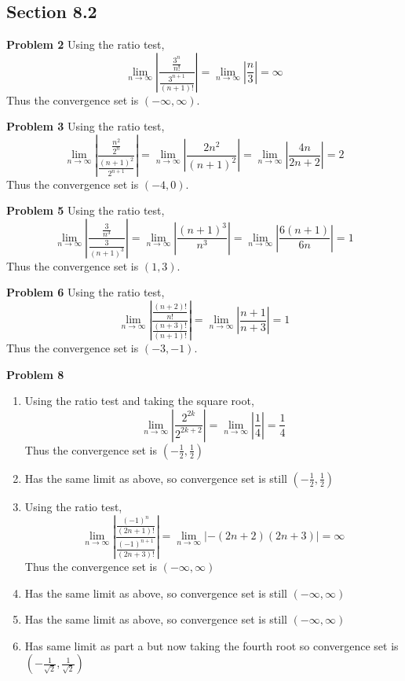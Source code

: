 \subsection*{Section 8.2}
\textbf{Problem 2}
Using the ratio test,
\[
    \lim_{n \to \infty} \left| \frac{\frac{3^n}{n!}}{\frac{3^{n+1}}{(n+1)!}}\right|
    = \lim_{n \to \infty} \left| \frac{n}{3}\right|
    = \infty
\]
Thus the convergence set is $(-\infty, \infty)$. 

\textbf{Problem 3}
Using the ratio test,
\[
    \lim_{n \to \infty} \left| \frac{\frac{n^2}{2^n}}{\frac{(n+1)^2}{2^{n+1}}}\right|
    = \lim_{n \to \infty} \left| \frac{2n^2}{(n+1)^2}\right|
    = \lim_{n \to \infty} \left| \frac{4n}{2n+2}\right|
    = 2
\]
Thus the convergence set is $(-4, 0)$. 

\textbf{Problem 5}
Using the ratio test,
\[
    \lim_{n \to \infty} \left| \frac{\frac{3}{n^3}}{\frac{3}{(n+1)^3}}\right|
    = \lim_{n \to \infty} \left| \frac{(n+1)^3}{n^3}\right|
    = \lim_{n \to \infty} \left| \frac{6(n+1)}{6n}\right|
    = 1
\]
Thus the convergence set is $(1, 3)$. 

\textbf{Problem 6}
Using the ratio test,
\[
    \lim_{n \to \infty} \left| \frac{\frac{(n+2)!}{n!}}{\frac{(n+3)!}{(n+1)!}}\right|
    = \lim_{n \to \infty} \left| \frac{n+1}{n+3} \right|
    = 1
\]
Thus the convergence set is $(-3, -1)$. 

\textbf{Problem 8}
\begin{enumerate}
    \item Using the ratio test and taking the square root,
    \[
        \lim_{n \to \infty} \left| \frac{2^{2k}}{2^{2k+2}}\right|
        = \lim_{n \to \infty} \left| \frac{1}{4} \right|
        = \frac{1}{4}
    \]
    Thus the convergence set is $\left(-\frac{1}{2}, \frac{1}{2}\right)$ 
    \item Has the same limit as above, so convergence set is still $\left(-\frac{1}{2}, \frac{1}{2}\right)$ 
    \item Using the ratio test,
    \[
        \lim_{n \to \infty} \left| \frac{\frac{(-1)^n}{(2n+1)!}}{\frac{(-1)^{n+1}}{(2n+3)!}}\right|
        = \lim_{n \to \infty} \left| -(2n+2)(2n+3) \right|
        = \infty
    \]
    Thus the convergence set is $(-\infty, \infty)$ 
    \item Has the same limit as above, so convergence set is still $(-\infty, \infty)$
    \item Has the same limit as above, so convergence set is still $(-\infty, \infty)$
    \item Has same limit as part a but now taking the fourth root so 
        convergence set is $\left(-\frac{1}{\sqrt{2}}, \frac{1}{\sqrt{2}}\right)$ 
\end{enumerate}

